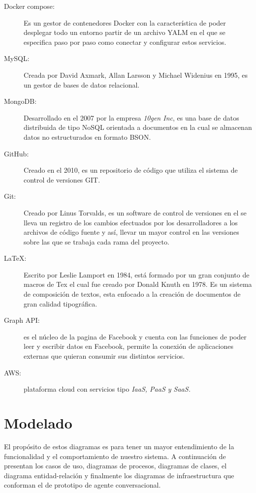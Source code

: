 \begin{description}
            \item[Docker compose:] Es un gestor de contenedores Docker con la característica de poder desplegar todo un entorno partir de un archivo YALM en el que se especifica paso por paso como conectar y configurar estos servicios.
            \item[MySQL:] Creada por David Axmark, Allan Larsson y Michael Widenius en 1995, es un gestor de bases de datos relacional.
            \item[MongoDB:] Desarrollado en el 2007 por la empresa \textit{10gen Inc}, es una base de datos distribuida de tipo NoSQL orientada a documentos en la cual se almacenan datos no estructurados en formato BSON.  
            \item[GitHub:] Creado en el 2010, es un repositorio de código que utiliza el sistema de control de versiones GIT.
            \item[Git:] Creado por  Linus Torvalds, es un software de control de versiones en el se lleva un registro de los cambios efectuados por los desarrolladores a los archivos de código fuente y así, llevar un mayor control en las versiones sobre las que se trabaja cada rama del proyecto.
            \item[\LaTeX:] Escrito por Leslie Lamport en 1984, está formado por un gran conjunto de macros de Tex el cual fue creado por Donald Knuth en 1978. Es un sistema de composición de textos, esta enfocado a la creación de documentos de gran calidad tipográfica.
            \item[Graph API:] es el núcleo de la pagina de Facebook y cuenta con las funciones de poder leer y escribir datos en Facebook, permite la conexión de aplicaciones externas que quieran consumir sus distintos servicios.
            \item[AWS:] plataforma cloud con servicios tipo \it{IaaS}, \it{PaaS} y \it{SaaS}.
        \end{description}
        
    \section{Modelado}
    El propósito de estos diagramas es para tener un mayor entendimiento de la funcionalidad y el comportamiento de nuestro sistema. A continuación de presentan los casos de uso, diagramas de procesos, diagramas de clases, el diagrama entidad-relación y finalmente los diagramas de infraestructura que conforman el de prototipo de agente conversacional.
